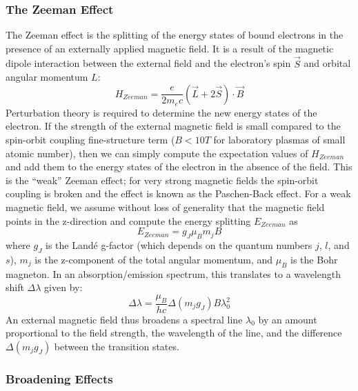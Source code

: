 \documentclass{jpp}
\begin{document}
\subsubsection{The Zeeman Effect}

The Zeeman effect is the splitting of the energy states of bound electrons in the presence of an externally applied magnetic field. It is a result of the magnetic dipole interaction between the external field and the electron's spin $\vec S$ and orbital angular momentum $L$:
\begin{equation*}
H_{Zeeman} = \frac{e}{2 m_e c} (\vec L + 2 \vec S) \cdot \vec B
\end{equation*}
Perturbation theory is required to determine the new energy states of the electron. If the strength of the external magnetic field is small compared to the spin-orbit coupling fine-structure term ($B < 10 T$ for laboratory plasmas of small atomic number), then we can simply compute the expectation values of $H_{Zeeman}$ and add them to the energy states of the electron in the absence of the field. This is the ``weak'' Zeeman effect; for very strong magnetic fields the spin-orbit coupling is broken and the effect is known as the Paschen-Back effect. For a weak magnetic field, we assume without loss of generality that the magnetic field points in the z-direction and compute the energy splitting $E_{Zeeman}$ as
\begin{equation*}
E_{Zeeman} = g_J \mu_B m_j B
\end{equation*}
where $g_J$ is the Landé g-factor (which depends on the quantum numbers $j$, $l$, and $s$), $m_j$ is the z-component of the total angular momentum, and $\mu_B$ is the Bohr magneton. In an absorption/emission spectrum, this translates to a wavelength shift $\Delta \lambda$ given by:
\begin{equation*}
\Delta \lambda = \frac{\mu_B}{h c} \Delta (m_j g_J) B \lambda_0 ^2
\end{equation*}
An external magnetic field thus broadens a spectral line $\lambda _0$ by an amount proportional to the field strength, the wavelength of the line, and the difference $\Delta (m_j g_J)$ between the transition states.

\subsubsection{Broadening Effects}
\end{document}
